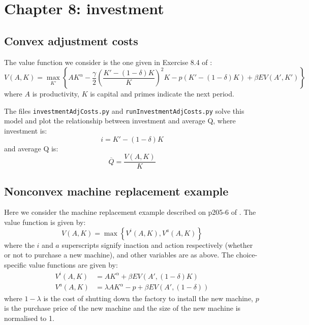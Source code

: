\section{Chapter 8: investment}

\subsection{Convex adjustment costs}

The value function we consider is the one given in Exercise 8.4 of \citet{adda2003dynamic}:
%
\begin{equation}
	V(A, K) = \max_{K'} \left\{ AK^{\alpha} - \frac{\gamma}{2}\left(\frac{K' - (1 - \delta)K}{K}\right)^2 K - p(K' - (1 - \delta)K) + \beta EV(A', K') \right\}
\end{equation}
%
where \(A\) is productivity, \(K\) is capital and primes indicate the next period.

The files \texttt{investmentAdjCosts.py} and \texttt{runInvestmentAdjCosts.py} solve this model and plot the relationship between investment and average Q, where investment is:
%
\begin{equation}
	i = K' - (1 - \delta)K
\end{equation}
%
and average Q is:
%
\begin{equation}
	\overline{Q} = \frac{V(A, K)}{K}
\end{equation}
%

\subsection{Nonconvex machine replacement example}

Here we consider the machine replacement example described on p205-6 of \citet{adda2003dynamic}. The value function is given by:
%
\begin{equation}
	V(A, K) = \max \left\{ V^i(A, K), V^a(A, K) \right\}
\end{equation}
%
where the \(i\) and \(a\) superscripts signify inaction and action respectively (whether or not to purchase a new machine), and other variables are as above. The choice-specific value functions are given by:
%
\begin{align}
 V^i(A, K) &=  AK^{\alpha} + \beta E V(A', (1 - \delta)K) \\
 V^a(A, K) &=  \lambda AK^{\alpha} - p + \beta E V(A', (1 - \delta))
\end{align}
%
where \(1 - \lambda\) is the cost of shutting down the factory to install the new machine, \(p\) is the purchase price of the new machine and the size of the new machine is normalised to 1.